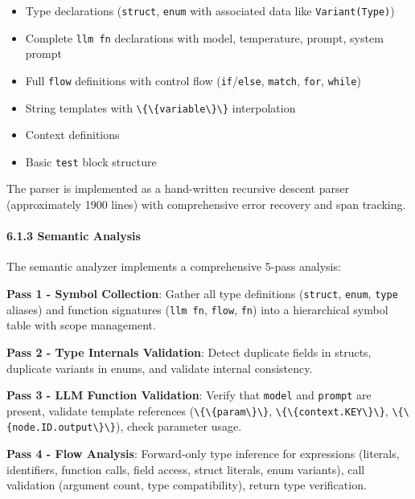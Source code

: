 \documentclass[
]{article}
\newcommand{\passthrough}[1]{#1}
\providecommand{\tightlist}{%
  \setlength{\itemsep}{0pt}\setlength{\parskip}{0pt}}
\begin{document}
\begin{itemize}
\tightlist
\item
  Type declarations (\passthrough{\lstinline!struct!},
  \passthrough{\lstinline!enum!} with associated data like
  \passthrough{\lstinline!Variant(Type)!})
\item
  Complete \passthrough{\lstinline!llm fn!} declarations with model,
  temperature, prompt, system prompt
\item
  Full \passthrough{\lstinline!flow!} definitions with control flow
  (\passthrough{\lstinline!if!}/\passthrough{\lstinline!else!},
  \passthrough{\lstinline!match!}, \passthrough{\lstinline!for!},
  \passthrough{\lstinline!while!})
\item
  String templates with \passthrough{\lstinline!\{\{variable\}\}!}
  interpolation
\item
  Context definitions
\item
  Basic \passthrough{\lstinline!test!} block structure
\end{itemize}

The parser is implemented as a hand-written recursive descent parser
(approximately 1900 lines) with comprehensive error recovery and span
tracking.

\paragraph{6.1.3 Semantic Analysis}\label{semantic-analysis}

The semantic analyzer implements a comprehensive 5-pass analysis:

\textbf{Pass 1 - Symbol Collection}: Gather all type definitions
(\passthrough{\lstinline!struct!}, \passthrough{\lstinline!enum!},
\passthrough{\lstinline!type!} aliases) and function signatures
(\passthrough{\lstinline!llm fn!}, \passthrough{\lstinline!flow!},
\passthrough{\lstinline!fn!}) into a hierarchical symbol table with
scope management.

\textbf{Pass 2 - Type Internals Validation}: Detect duplicate fields in
structs, duplicate variants in enums, and validate internal consistency.

\textbf{Pass 3 - LLM Function Validation}: Verify that
\passthrough{\lstinline!model!} and \passthrough{\lstinline!prompt!} are
present, validate template references
(\passthrough{\lstinline!\{\{param\}\}!},
\passthrough{\lstinline!\{\{context.KEY\}\}!},
\passthrough{\lstinline!\{\{node.ID.output\}\}!}), check parameter
usage.

\textbf{Pass 4 - Flow Analysis}: Forward-only type inference for
expressions (literals, identifiers, function calls, field access, struct
literals, enum variants), call validation (argument count, type
compatibility), return type verification.
\end{document}
